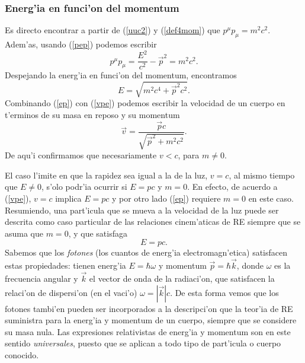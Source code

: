 \subsubsection{Energ'ia en funci'on del momentum}

Es directo encontrar a partir de (\ref{uuc2}) y (\ref{def4mom}) que $p^\mu
p_\mu=m^2c^2$. Adem'as, usando (\ref{pep}) podemos escribir
\begin{equation}
p^\mu p_\mu =\frac{E^2}{c^2}-\vec{p}^2=m^2c^2.
\end{equation}
Despejando la energ'ia en funci'on del momentum, encontramos
\begin{equation}
\boxed{E=\sqrt{m^2c^4+\vec{p}^2c^2}.} \label{ep}
\end{equation}
Combinando (\ref{ep}) con (\ref{vpe}) podemos escribir la velocidad de un cuerpo en t'erminos de su masa en reposo y su momentum
\begin{equation}
\vec{v}=\frac{\vec{p}c}{\sqrt{\vec{p}^2+m^2c^2}}. \label{vpp}
\end{equation}
De aqu'i confirmamos que necesariamente $v<c$, para $m\neq 0$.

El caso l'imite en que la rapidez sea igual a la de la luz, $v=c$, al mismo tiempo que $E\neq 0$, s'olo podr'ia ocurrir si $E=pc$ y $m=0$. En efecto, de acuerdo a (\ref{vpe}), $v=c$ implica $E=pc$ y por otro lado (\ref{ep}) requiere $m=0$ en este caso. Resumiendo, una part'icula que se mueva a la velocidad de la luz puede ser descrita como caso particular de las relaciones cinem'aticas de RE siempre que se asuma que $m=0$, y que satisfaga
\begin{equation}
E=pc.
\end{equation}
Sabemos que los \textit{fotones} (los cuantos de energ'ia electromagn'etica) satisfacen estas propiedades: tienen energ'ia $E=\hbar\omega$ y momentum $\vec{p}=\hbar\vec{k}$, donde $\omega$ es la frecuencia angular y $\vec{k}$ el vector de onda de la radiaci'on, que satisfacen la relaci'on de dispersi'on (en el vaci'o) $\omega=|\vec{k}|c$. De esta forma vemos que los fotones tambi'en pueden ser incorporados a la descripci'on que la teor'ia de RE suministra para la energ'ia y momentum de un cuerpo, siempre que se considere su masa nula. Las expresiones relativistas de energ'ia y momentum son en este sentido \textit{universales}, puesto que se aplican a todo tipo de part'icula o cuerpo conocido.



